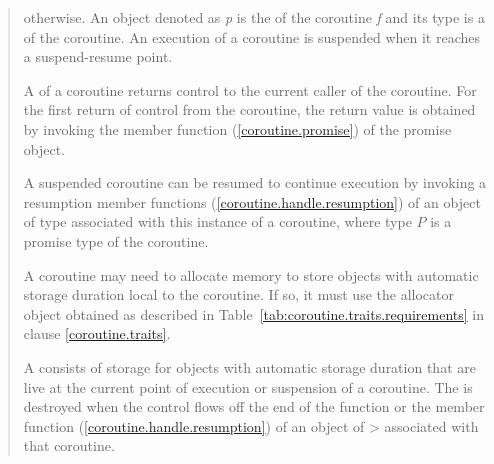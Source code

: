 \begin{quote}
otherwise. An object denoted as \textit{p} is the  of
the coroutine \textit{f} and its type is a 
of the coroutine.
An execution of a coroutine is suspended when it reaches a suspend-resume point.

\pnum 
A  of a coroutine returns control to the current
caller of the coroutine. For the first return of control from the coroutine, the return value is obtained by invoking the member function 
 (\ref{coroutine.promise})
of the promise object.


\pnum
A suspended coroutine can be resumed
to continue execution by invoking
a resumption member functions (\ref{coroutine.handle.resumption}) of an object of  type
associated with this instance of a coroutine, where type $P$
is a promise type of the coroutine. 

\pnum
A coroutine may need to allocate
memory to store objects with automatic storage duration
local to the coroutine. If so, it must
use the allocator object obtained as described in 
Table~\ref{tab:coroutine.traits.requirements} in clause \ref{coroutine.traits}.

\pnum
A  consists of 
storage for objects with automatic storage duration
that are live at the current point of execution or suspension of 
a coroutine.
The  is destroyed when
the control flows off the end of the function or
the  member function (\ref{coroutine.handle.resumption}) of an object of > associated with that coroutine.



%
%


\end{quote}
